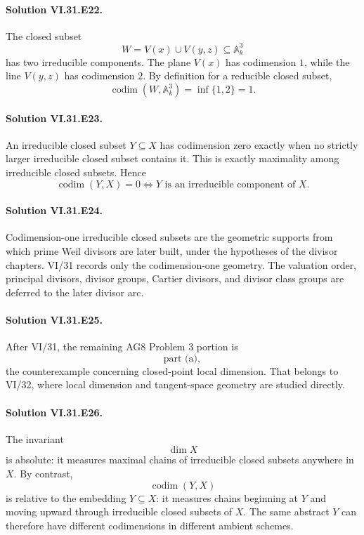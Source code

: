 \paragraph{Solution VI.31.E22.}
The closed subset
\[
W=V(x)\cup V(y,z)\subseteq\mathbb A^3_k
\]
has two irreducible components.  The plane \(V(x)\) has codimension \(1\), while the line \(V(y,z)\) has
codimension \(2\).  By definition for a reducible closed subset,
\[
\operatorname{codim}(W,\mathbb A^3_k)
=
\inf\{1,2\}
=
\boxed{1}.
\]

\paragraph{Solution VI.31.E23.}
An irreducible closed subset \(Y\subseteq X\) has codimension zero exactly when no strictly larger irreducible
closed subset contains it.  This is exactly maximality among irreducible closed subsets.  Hence
\[
\boxed{\operatorname{codim}(Y,X)=0\iff Y\text{ is an irreducible component of }X}.
\]

\paragraph{Solution VI.31.E24.}
Codimension-one irreducible closed subsets are the geometric supports from which prime Weil divisors are later
built, under the hypotheses of the divisor chapters.  VI/31 records only the codimension-one geometry.  The
valuation order, principal divisors, divisor groups, Cartier divisors, and divisor class groups are deferred to
the later divisor arc.

\paragraph{Solution VI.31.E25.}
After VI/31, the remaining AG8 Problem 3 portion is
\[
\boxed{\text{part (a)}},
\]
the counterexample concerning closed-point local dimension.  That belongs to VI/32, where local dimension and
tangent-space geometry are studied directly.

\paragraph{Solution VI.31.E26.}
The invariant
\[
\dim X
\]
is absolute: it measures maximal chains of irreducible closed subsets anywhere in \(X\).  By contrast,
\[
\operatorname{codim}(Y,X)
\]
is relative to the embedding \(Y\subseteq X\): it measures chains beginning at \(Y\) and moving upward through
irreducible closed subsets of \(X\).  The same abstract \(Y\) can therefore have different codimensions in
different ambient schemes.
